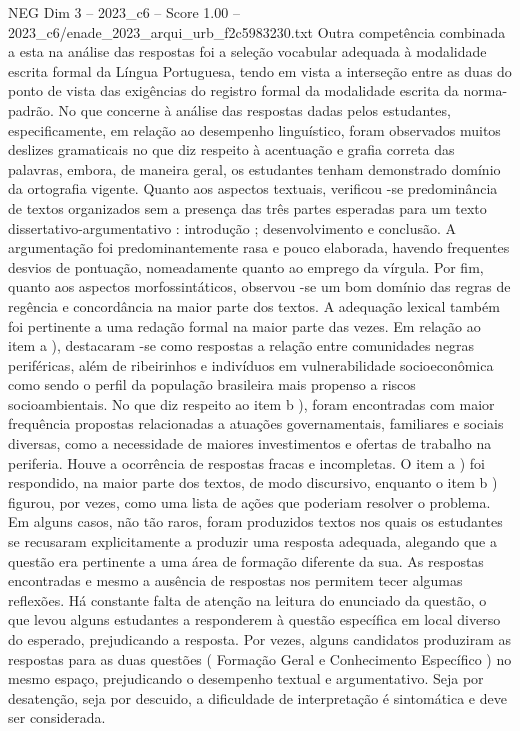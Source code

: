 \begin{textsample}{NEG Dim 3 – 2023\_c6 – Score 1.00 – 2023\_c6/enade\_2023\_arqui\_urb\_f2c5983230.txt}
Outra competência combinada a esta na análise das respostas foi a seleção vocabular adequada à modalidade escrita formal da Língua Portuguesa, tendo em vista a interseção entre as duas do ponto de vista das exigências do registro formal da modalidade escrita da norma-padrão.
No que concerne à análise das respostas dadas pelos estudantes, especificamente, em relação ao desempenho linguístico, foram observados muitos deslizes gramaticais no que diz respeito à acentuação e grafia correta das palavras, embora, de maneira geral, os estudantes tenham demonstrado domínio da ortografia vigente.
Quanto aos aspectos textuais, verificou -se predominância de textos organizados sem a presença das três partes esperadas para um texto dissertativo-argumentativo : introdução ; desenvolvimento e conclusão.
A argumentação foi predominantemente rasa e pouco elaborada, havendo frequentes desvios de pontuação, nomeadamente quanto ao emprego da vírgula.
Por fim, quanto aos aspectos morfossintáticos, observou -se um bom domínio das regras de regência e concordância na maior parte dos textos.
A adequação lexical também foi pertinente a uma redação formal na maior parte das vezes.
Em relação ao item a ), destacaram -se como respostas a relação entre comunidades negras periféricas, além de ribeirinhos e indivíduos em vulnerabilidade socioeconômica como sendo o perfil da população brasileira mais propenso a riscos socioambientais.
No que diz respeito ao item b ), foram encontradas com maior frequência propostas relacionadas a atuações governamentais, familiares e sociais diversas, como a necessidade de maiores investimentos e ofertas de trabalho na periferia.
Houve a ocorrência de respostas fracas e incompletas.
O item a ) foi respondido, na maior parte dos textos, de modo discursivo, enquanto o item b ) figurou, por vezes, como uma lista de ações que poderiam resolver o problema.
Em alguns casos, não tão raros, foram produzidos textos nos quais os estudantes se recusaram explicitamente a produzir uma resposta adequada, alegando que a questão era pertinente a uma área de formação diferente da sua.
As respostas encontradas e mesmo a ausência de respostas nos permitem tecer algumas reflexões.
Há constante falta de atenção na leitura do enunciado da questão, o que levou alguns estudantes a responderem à questão específica em local diverso do esperado, prejudicando a resposta.
Por vezes, alguns candidatos produziram as respostas para as duas questões ( Formação Geral e Conhecimento Específico ) no mesmo espaço, prejudicando o desempenho textual e argumentativo.
Seja por desatenção, seja por descuido, a dificuldade de interpretação é sintomática e deve ser considerada.

\end{textsample}
